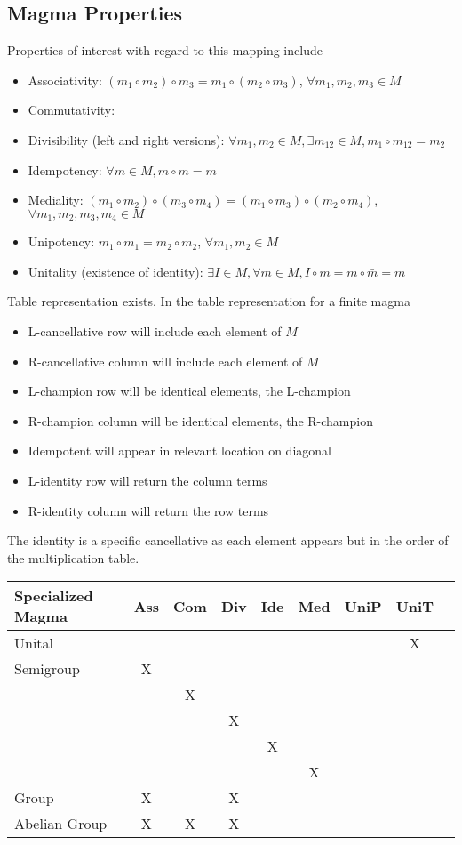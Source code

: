 \documentclass[a4paper]{scrartcl}
\begin{document}
\subsection{Magma Properties}
Properties of interest with regard to this mapping include
\begin{itemize}
\item{Associativity: $(m_{1}\circ m_{2}) \circ m_{3} = m_{1}\circ (m_{2} \circ m_{3})$, $\forall m_{1}, m_{2}, m_{3} \in M$}
\item{Commutativity: }
\item{Divisibility (left and right versions): $\forall m_{1}, m_{2} \in M, \exists m_{12}\in M, m_{1} \circ m_{12} = m_{2}$}
\item{Idempotency: $\forall m\in M, m\circ m = m$}
\item{Mediality: $(m_{1}\circ m_{2})\circ (m_{3}\circ m_{4}) =
(m_{1}\circ m_{3})\circ (m_{2}\circ m_{4})$, $\forall m_{1}, m_{2}, m_{3}, m_{4}\in M$}
\item{Unipotency: $m_{1}\circ m_{1} = m_{2}\circ m_{2}$, $\forall m_{1}, m_{2} \in M$}
\item{Unitality (existence of identity): $\exists I \in M, \forall m \in M, I\circ m = m \circ \bar{m} = m$}
\end{itemize}




Table representation exists. In the table representation for a finite magma
\begin{itemize}
\item{L-cancellative row will include each element of $M$}
\item{R-cancellative column will include each element of $M$}
\item{L-champion row will be identical elements, the L-champion}
\item{R-champion column will be identical elements, the R-champion} 
\item{Idempotent will appear in relevant location on diagonal}
\item{L-identity row will return the column terms}
\item{R-identity column will return the row terms}
\end{itemize}
The identity is a specific cancellative as each element appears but in the order of the multiplication table.

\begin{tabular}{| l | c | c | c | c | c | c | c | c |} \hline
Specialized Magma & Ass & Com & Div & Ide & Med & UniP & UniT \\ \hline 
Unital & & & & & & & X  \\ \hline
Semigroup & X & & & & & \\ \hline
& & X & & & & \\ \hline
& & & X & & & \\ \hline
& & & & X & & \\ \hline
& & & & & X & \\ \hline
Group & X & & X \\ \hline
Abelian Group & X & X & X \\ \hline
\end {tabular}
\\
\end{document}
